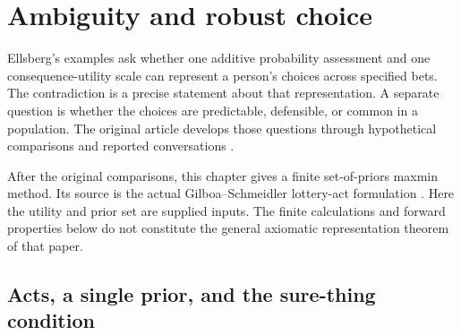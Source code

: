 \chapter{Ambiguity and robust choice}
\label{sec:p17-ambiguity-and-robust-choice}

Ellsberg's examples ask whether one additive probability assessment
and one consequence-utility scale can represent a person's choices
across specified bets. The contradiction is a precise statement about
that representation. A separate question is whether the choices are
predictable, defensible, or common in a population.
The original article develops those questions through hypothetical
comparisons and reported conversations
\cite[pp.~643--669]{Ellsberg1961Ambiguity}.

After the original comparisons, this chapter gives a finite
set-of-priors maxmin method. Its source is the actual
Gilboa--Schmeidler lottery-act formulation
\cite[pp.~141--145]{GilboaSchmeidler1989Maxmin}.
Here the utility and prior set are supplied inputs. The finite
calculations and forward properties below do not constitute the
general axiomatic representation theorem of that paper.

\section{Acts, a single prior, and the sure-thing condition}

